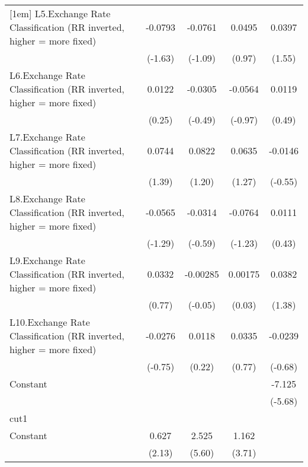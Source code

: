 {\begin{tabular}{l*{4}{c}}
[1em]
L5.Exchange Rate Classification (RR inverted, higher = more fixed)&  -0.0793         &  -0.0761         &   0.0495         &   0.0397         \\
                &  (-1.63)         &  (-1.09)         &   (0.97)         &   (1.55)         \\
[1em]
L6.Exchange Rate Classification (RR inverted, higher = more fixed)&   0.0122         &  -0.0305         &  -0.0564         &   0.0119         \\
                &   (0.25)         &  (-0.49)         &  (-0.97)         &   (0.49)         \\
[1em]
L7.Exchange Rate Classification (RR inverted, higher = more fixed)&   0.0744         &   0.0822         &   0.0635         &  -0.0146         \\
                &   (1.39)         &   (1.20)         &   (1.27)         &  (-0.55)         \\
[1em]
L8.Exchange Rate Classification (RR inverted, higher = more fixed)&  -0.0565         &  -0.0314         &  -0.0764         &   0.0111         \\
                &  (-1.29)         &  (-0.59)         &  (-1.23)         &   (0.43)         \\
[1em]
L9.Exchange Rate Classification (RR inverted, higher = more fixed)&   0.0332         & -0.00285         &  0.00175         &   0.0382         \\
                &   (0.77)         &  (-0.05)         &   (0.03)         &   (1.38)         \\
[1em]
L10.Exchange Rate Classification (RR inverted, higher = more fixed)&  -0.0276         &   0.0118         &   0.0335         &  -0.0239         \\
                &  (-0.75)         &   (0.22)         &   (0.77)         &  (-0.68)         \\
[1em]
Constant        &                  &                  &                  &   -7.125\sym{***}\\
                &                  &                  &                  &  (-5.68)         \\
\hline
cut1            &                  &                  &                  &                  \\
Constant        &    0.627\sym{*}  &    2.525\sym{***}&    1.162\sym{***}&                  \\
                &   (2.13)         &   (5.60)         &   (3.71)         &                  \\

\end{tabular}}
